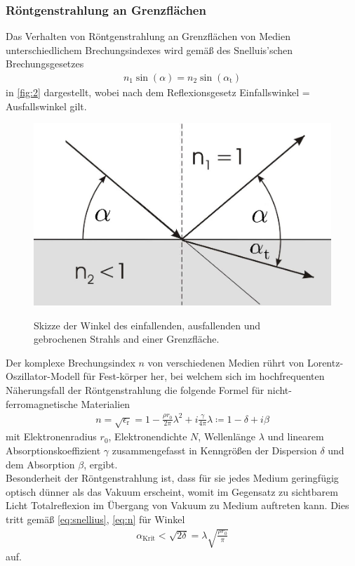 \documentclass[12pt]{article}
\begin{document}
\subsubsection{Röntgenstrahlung an Grenzflächen}
Das Verhalten von Röntgenstrahlung an Grenzflächen von Medien unterschiedlichem Brechungsindexes wird gemäß des Snelluis'schen Brechungsgesetzes
\begin{align}
  n_1 \sin(\alpha) = n_2 \sin(\alpha_\text{t})\label{eq:snellius}
\end{align}
in \autoref{fig:2} dargestellt, wobei nach dem Reflexionsgesetz Einfallswinkel = Ausfallswinkel gilt.
\begin{figure}[H]
  \centering
  \includegraphics[scale=0.3]{Ressourcen/Snellius.png}
  \caption{Skizze der Winkel des einfallenden, ausfallenden und\\ gebrochenen Strahls and einer Grenzfläche.}\cite{uni_giessen}\label{fig:2}
\end{figure}
Der komplexe Brechungsindex $n$ von verschiedenen Medien rührt von Lorentz-Oszillator-Modell für Fest-körper her, bei welchem sich im hochfrequenten Näherungsfall der Röntgenstrahlung die folgende Formel für nicht-ferromagnetische Materialien  
\begin{align}
  n=\sqrt{\epsilon_\text{r}}=1-\frac{\rho r_0}{2\pi}\lambda^2+i \frac{\gamma}{4\pi}\lambda \coloneqq 1-\delta+i\beta\label{eq:n}
\end{align}
mit Elektronenradius $r_0$, Elektronendichte $N$, Wellenlänge $\lambda$ und linearem Absorptionskoeffizient $\gamma$ zusammengefasst in Kenngrößen der Dispersion $\delta$ und dem Absorption $\beta$, ergibt. 
\\\linebreak Besonderheit der Röntgenstrahlung ist, dass für sie jedes Medium geringfügig optisch dünner als das Vakuum erscheint, womit im Gegensatz zu sichtbarem Licht Totalreflexion im Übergang von Vakuum zu Medium auftreten kann.
Dies tritt gemäß \autoref{eq:snellius}, \ref{eq:n} für Winkel
\begin{align}
  \alpha_\text{Krit} < \sqrt{2 \delta} = \lambda \sqrt{\frac{\rho r_0}{\pi}}
\end{align}
auf.
\end{document}
